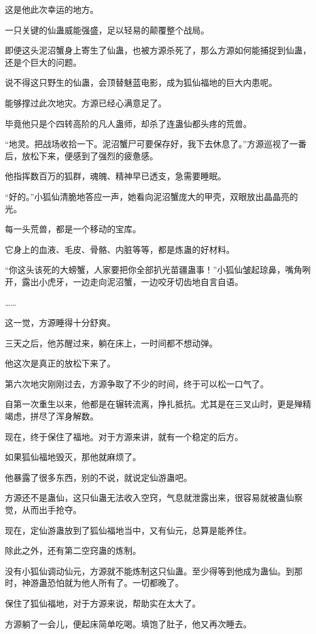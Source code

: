 \begin{this_body}
这是他此次幸运的地方。

一只关键的仙蛊威能强盛，足以轻易的颠覆整个战局。

即便这头泥沼蟹身上寄生了仙蛊，也被方源杀死了，那么方源如何能捕捉到仙蛊，还是个巨大的问题。

说不得这只野生的仙蛊，会顶替魅蓝电影，成为狐仙福地的巨大内患呢。

能够撑过此次地灾。方源已经心满意足了。

毕竟他只是个四转高阶的凡人蛊师，却杀了连蛊仙都头疼的荒兽。

“地灵。把战场收拾一下。泥沼蟹尸可要保存好，我下去休息了。”方源巡视了一番后，放松下来，便感到了强烈的疲惫感。

他指挥数百万的狐群，魂魄、精神早已透支，急需要睡眠。

“好的。”小狐仙清脆地答应一声，她看向泥沼蟹庞大的甲壳，双眼放出晶晶亮的光。

每一头荒兽，都是一个移动的宝库。

它身上的血液、毛皮、骨骼、内脏等等，都是炼蛊的好材料。

“你这头该死的大螃蟹，人家要把你全部扒光苗疆蛊事！”小狐仙皱起琼鼻，嘴角咧开，露出小虎牙，一边走向泥沼蟹，一边咬牙切齿地自言自语。

……

这一觉，方源睡得十分舒爽。

三天之后，他苏醒过来，躺在床上，一时间都不想动弹。

他这次是真正的放松下来了。

第六次地灾刚刚过去，方源争取了不少的时间，终于可以松一口气了。

自第一次重生以来，他都是在辗转流离，挣扎抵抗。尤其是在三叉山时，更是殚精竭虑，拼尽了浑身解数。

现在，终于保住了福地。对于方源来讲，就有一个稳定的后方。

如果狐仙福地毁灭，那他就麻烦了。

他暴露了很多东西，别的不说，就说定仙游蛊吧。

方源还不是蛊仙，这只仙蛊无法收入空窍，气息就泄露出来，很容易就被蛊仙察觉，从而出手抢夺。

现在，定仙游蛊放到了狐仙福地当中，又有仙元，总算是能养住。

除此之外，还有第二空窍蛊的炼制。

没有小狐仙调动仙元，方源就不能炼制这只仙蛊。至少得等到他成为蛊仙。到那时，神游蛊恐怕就为他人所有了。一切都晚了。

保住了狐仙福地，对于方源来说，帮助实在太大了。

方源躺了一会儿，便起床简单吃喝。填饱了肚子，他又再次睡去。


\end{this_body}
